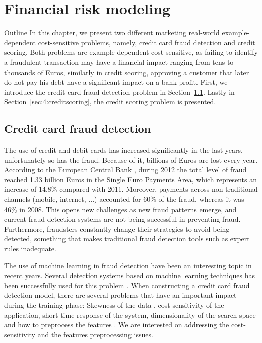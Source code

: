 \chapter{Financial risk modeling}\label{ch:4}

\begin{remark}{Outline}
In this chapter, we present two different marketing real-world example-dependent 
cost-sensitive problems, namely, credit card fraud detection and credit scoring. Both problems 
are example-dependent cost-sensitive, as failing to identify a fraudulent transaction may have a 
financial impact ranging from tens to thousands of Euros, similarly in credit scoring, approving a 
customer that later do not pay his debt have a significant impact on a bank profit.
First, we introduce the credit card fraud detection problem in Section~\ref{sec:4:fraud}. Lastly in 
Section~\ref{sec:4:creditscoring}, the credit scoring problem is presented.
\end{remark}

\section{Credit card fraud detection}
\label{sec:4:fraud}

  The use of credit and debit cards has increased significantly   in the last years, unfortunately 
	so has the fraud. Because of it, billions of Euros are lost every year. According to 
	the European Central Bank \citep{EuropeanCentralBank2013}, during 2012 the total level of fraud 
	reached 1.33 billion Euros in the Single Euro Payments Area, which represents an increase of 
	14.8\% compared with 2011. Moreover, payments across non traditional channels (mobile, internet, 
	...) accounted for 60\% of the fraud, whereas it was 46\% in 2008. This opens new challenges as 
	new fraud patterns emerge, and current fraud detection systems are not being successful in 
	preventing fraud. Furthermore, fraudsters constantly change their strategies to avoid being 
	detected, something that makes traditional fraud detection tools such as expert rules inadequate.
  
  The use of machine learning in fraud detection have been an interesting topic in recent years. 
  Several detection systems based on machine learning techniques has been successfully used 
	for this problem \citep{Bhattacharyya2011}. When constructing a credit card fraud detection 
  model, there are several problems that have an important impact during the training phase: 
  Skewness of 	the data , cost-sensitivity of the application, short time response of the system, 
  dimensionality of the search space and how to preprocess the features
	\citep{Bolton2002,Gadi2008,Whitrow2008,DalPozzolo2014}.	We are interested on 
	addressing the cost-sensitivity and the features preprocessing 	issues. 
	
